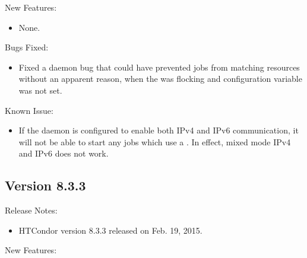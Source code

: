 \noindent New Features:

\begin{itemize}

\item None.

\end{itemize}

\noindent Bugs Fixed:

\begin{itemize}

\item Fixed a  daemon bug
that could have prevented jobs from matching resources
without an apparent reason,
when the  was flocking
and configuration variable  was not set.

\end{itemize}

\noindent Known Issue:
\begin{itemize}
\item If the  daemon is configured to enable both
IPv4 and IPv6 communication,
it will not be able to start any jobs which use a .
In effect, mixed mode IPv4 and IPv6 does not work.
\end{itemize}
\subsection*{\label{sec:New-8-3-3}Version 8.3.3}

\noindent Release Notes:

\begin{itemize}

\item HTCondor version 8.3.3 released on Feb. 19, 2015.

\end{itemize}


\noindent New Features:

